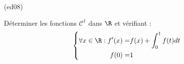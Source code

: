 \begin{tiny}(ed08)\end{tiny}
Déterminer les fonctions $\mathcal C^1$ dans $\R$ et vérifiant :
\begin{displaymath}
\left\lbrace 
\begin{aligned}
 \forall x\in \R : f'(x) =& f(x) +\int_0^1f(t)dt \\
f(0)=&1
\end{aligned}
\right. 
\end{displaymath}
